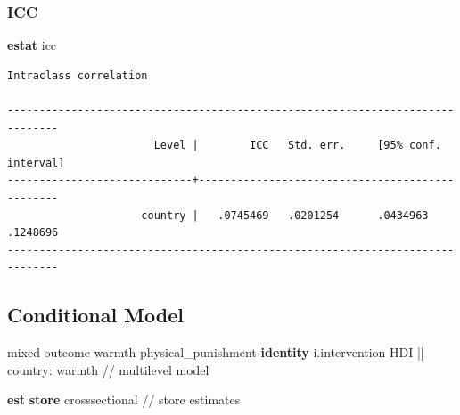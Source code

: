 \documentclass[
  letterpaper,
  DIV=11,
  numbers=noendperiod]{scrreprt}
\newenvironment{Shaded}{\begin{snugshade}}{\end{snugshade}}
\newcommand{\CommentTok}[1]{\textcolor[rgb]{0.37,0.37,0.37}{#1}}
\newcommand{\KeywordTok}[1]{\textcolor[rgb]{0.00,0.23,0.31}{\textbf{#1}}}
\newcommand{\NormalTok}[1]{\textcolor[rgb]{0.00,0.23,0.31}{#1}}
\begin{document}
\subsubsection{ICC}\label{icc}

\begin{Shaded}
\begin{Highlighting}[]

\KeywordTok{estat}\NormalTok{ icc}
\end{Highlighting}
\end{Shaded}

\begin{verbatim}
Intraclass correlation

------------------------------------------------------------------------------
                       Level |        ICC   Std. err.     [95% conf. interval]
-----------------------------+------------------------------------------------
                     country |   .0745469   .0201254      .0434963    .1248696
------------------------------------------------------------------------------
\end{verbatim}

\subsection{Conditional Model}\label{conditional-model}

\begin{Shaded}
\begin{Highlighting}[]

\NormalTok{mixed outcome warmth physical\_punishment }\KeywordTok{identity}\NormalTok{ i.intervention HDI || country: warmth }\CommentTok{// multilevel model}

\KeywordTok{est} \KeywordTok{store}\NormalTok{ crosssectional }\CommentTok{// store estimates}
\end{Highlighting}
\end{Shaded}
\end{document}
